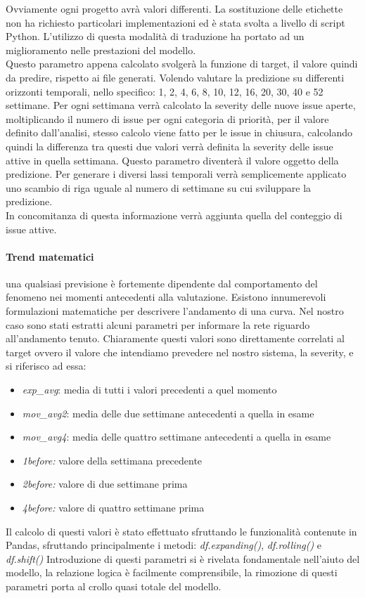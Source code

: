 \documentclass[%
    corpo=12pt,
    twoside,
    oldstyle,
    autoretitolo,
    greek,
    evenboxes,
]{toptesi}
\begin{document}
Ovviamente ogni progetto avrà valori differenti. La sostituzione delle etichette non ha richiesto particolari implementazioni ed è stata svolta a livello di script Python. L'utilizzo di questa modalità di traduzione ha portato ad un miglioramento nelle prestazioni del modello.\\
Questo parametro appena calcolato svolgerà la funzione di target, il valore quindi da predire, rispetto ai file generati. Volendo valutare la predizione su differenti orizzonti temporali, nello specifico: 1, 2, 4, 6, 8, 10, 12, 16, 20, 30, 40 e 52 settimane. Per ogni settimana verrà calcolato la severity delle nuove issue aperte, moltiplicando il numero di issue per ogni categoria di priorità, per il valore definito dall'analisi, stesso calcolo viene fatto per le issue in chiusura, calcolando quindi la differenza tra questi due valori verrà definita la severity delle issue attive in quella settimana. Questo parametro diventerà il valore oggetto della predizione. Per generare i diversi lassi temporali verrà semplicemente applicato uno scambio di riga uguale al numero di settimane su cui sviluppare la predizione.\\
In concomitanza di questa informazione verrà aggiunta quella del conteggio di issue attive.

\paragraph{Trend matematici} una qualsiasi previsione è fortemente dipendente dal comportamento del fenomeno nei momenti antecedenti alla valutazione. Esistono innumerevoli formulazioni matematiche per descrivere l'andamento di una curva. Nel nostro caso sono stati estratti alcuni parametri per informare la rete riguardo all'andamento tenuto. Chiaramente questi valori sono direttamente correlati al target ovvero il valore che intendiamo prevedere nel nostro sistema, la severity, e si riferisco ad essa:
\begin{itemize}
  \item \textit{exp\_avg}: media di tutti i valori precedenti a quel momento
  \item \textit{mov\_avg2}: media delle due settimane antecedenti a quella in esame
  \item \textit{mov\_avg4}: media delle quattro settimane antecedenti a quella in esame
  \item \textit{1before:} valore della settimana precedente
  \item \textit{2before:} valore di due settimane prima
  \item \textit{4before:} valore di quattro settimane prima
\end{itemize}
Il calcolo di questi valori è stato effettuato sfruttando le funzionalità contenute in Pandas, sfruttando principalmente i metodi: \textit{df.expanding()}, \textit{df.rolling()} e \textit{df.shift()}
Introduzione di questi parametri si è rivelata fondamentale nell'aiuto del modello, la relazione logica è facilmente comprensibile, la rimozione di questi parametri porta al crollo quasi totale del modello.
\end{document}
